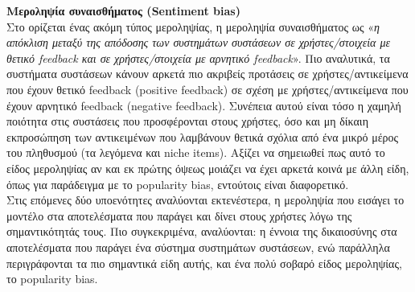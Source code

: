 \noindent\textbf{Μεροληψία συναισθήματος (Sentiment bias)}\\
Στο \cite{linMitigatingSentimentBias2021} ορίζεται ένας ακόμη τύπος μεροληψίας, η μεροληψία συναισθήματος ως «\textit{η απόκλιση μεταξύ της απόδοσης των συστημάτων συστάσεων σε χρήστες/στοιχεία με θετικό feedback και σε χρήστες/στοιχεία με αρνητικό feedback}». Πιο αναλυτικά, τα συστήματα συστάσεων κάνουν αρκετά πιο ακριβείς προτάσεις σε χρήστες/αντικείμενα που έχουν θετικό feedback (positive feedback) σε σχέση με χρήστες/αντικείμενα που έχουν αρνητικό feedback (negative feedback). Συνέπεια αυτού είναι τόσο η χαμηλή ποιότητα στις συστάσεις που προσφέρονται στους χρήστες, όσο και μη δίκαιη εκπροσώπηση των αντικειμένων που λαμβάνουν θετικά σχόλια από ένα μικρό μέρος του πληθυσμού (τα λεγόμενα και niche items). Αξίζει να σημειωθεί πως αυτό το είδος μεροληψίας αν και εκ πρώτης όψεως μοιάζει να έχει αρκετά κοινά με άλλη είδη, όπως για παράδειγμα με το popularity bias, εντούτοις είναι διαφορετικό.\\

\noindent Στις επόμενες δύο υποενότητες αναλύονται εκτενέστερα, η μεροληψία που εισάγει το μοντέλο στα αποτελέσματα που παράγει και δίνει στους χρήστες λόγω της σημαντικότητάς τους. Πιο συγκεκριμένα, αναλύονται: η έννοια της δικαιοσύνης στα αποτελέσματα που παράγει ένα σύστημα συστημάτων συστάσεων, ενώ παράλληλα περιγράφονται τα πιο σημαντικά είδη αυτής, και ένα πολύ σοβαρό είδος μεροληψίας, το popularity bias.

